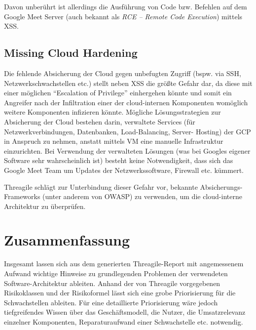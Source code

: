 \documentclass{article}
\begin{document}
Davon unberührt ist allerdings die Ausführung von Code bzw. Befehlen auf dem Google 
Meet Server (auch bekannt als \textit{RCE – Remote Code Execution}) mittels XSS.

\subsection{Missing Cloud Hardening}

Die fehlende Absicherung der Cloud gegen unbefugten Zugriff (bspw. via SSH, 
Netzwerkschwachstellen etc.) stellt neben XSS die größte Gefahr dar, da diese mit einer 
möglichen ``Escalation of Privilege'' einhergehen könnte und somit ein Angreifer nach der 
Infiltration einer der cloud-internen Komponenten womöglich weitere Komponenten 
infizieren könnte. Mögliche Lösungsstrategien zur Absicherung der Cloud bestehen darin,
verwaltete Services (für Netzwerkverbindungen, Datenbanken, Load-Balancing, Server-
Hosting) der GCP in Anspruch zu nehmen, anstatt mittels VM eine manuelle Infrastruktur 
einzurichten. Bei Verwendung der verwalteten Lösungen (was bei Googles eigener Software 
sehr wahrscheinlich ist) besteht keine Notwendigkeit, dass sich das Google Meet Team um 
Updates der Netzwerkssoftware, Firewall etc. kümmert. 

Threagile schlägt zur Unterbindung dieser Gefahr vor, bekannte Absicherungs-Frameworks 
(unter anderem von OWASP) zu verwenden, um die cloud-interne Architektur zu überprüfen.

\section{Zusammenfassung}

Insgesamt lassen sich aus dem generierten Threagile-Report mit angemessenem Aufwand wichtige 
Hinweise zu grundlegenden Problemen der verwendeten Software-Architektur ableiten. Anhand der
von Threagile vorgegebenen Risikoklassen und der Risikoformel lässt sich eine grobe Priorisierung
für die Schwachstellen ableiten. Für eine detaillierte Priorisierung wäre jedoch tiefgreifendes Wissen
über das Geschäftsmodell, die Nutzer, die Umsatzrelevanz einzelner Komponenten, Reparaturaufwand einer 
Schwachstelle etc. notwendig.
\end{document}
